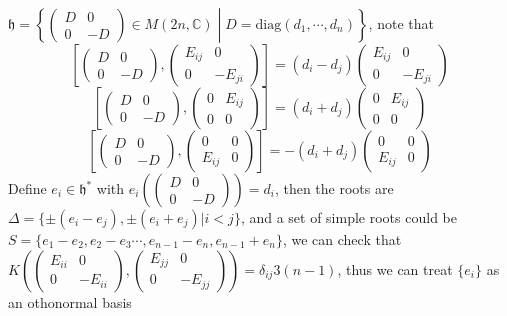 \documentclass[10pt]{article}
\newcommand{\<}[1]{\langle #1 \rangle}
\begin{document}
$\mathfrak{h}=\left\{\begin{pmatrix}
D&0 \\
0&-D
\end{pmatrix}\in M(2n,\mathbb C)\middle| D=\mathrm{diag}(d_1,\cdots,d_n)\right\}$, note that $$\left[\begin{pmatrix}
D&0 \\
0&-D
\end{pmatrix},\begin{pmatrix}
E_{ij}&0 \\
0&-E_{ji}
\end{pmatrix}\right]=(d_i-d_j)\begin{pmatrix}
E_{ij}&0 \\
0&-E_{ji}
\end{pmatrix}$$ $$\left[\begin{pmatrix}
D&0 \\
0&-D
\end{pmatrix},\begin{pmatrix}
0&E_{ij} \\
0&0
\end{pmatrix}\right]=(d_i+d_j)\begin{pmatrix}
0&E_{ij} \\
0&0
\end{pmatrix}$$ $$\left[\begin{pmatrix}
D&0 \\
0&-D
\end{pmatrix},\begin{pmatrix}
0&0 \\
E_{ij}&0
\end{pmatrix}\right]=-(d_i+d_j)\begin{pmatrix}
0&0 \\
E_{ij}&0
\end{pmatrix}$$Define $e_i\in\mathfrak{h}^*$ with $e_i\left(\begin{pmatrix}
D&0 \\
0&-D
\end{pmatrix}\right)=d_i$, then the roots are $\Delta=\{\pm(e_i-e_j),\pm(e_i+e_j)|i< j\}$, and a set of simple roots could be $S=\{e_1-e_2,e_2-e_3\cdots,e_{n-1}-e_n,e_{n-1}+e_n\}$, we can check that $K\left(\begin{pmatrix}
E_{ii}&0 \\
0&-E_{ii}
\end{pmatrix},\begin{pmatrix}
E_{jj}&0 \\
0&-E_{jj}
\end{pmatrix}\right)=\delta_{ij}3(n-1)$, thus we can treat $\{e_i\}$ as an othonormal basis \\
\end{document}
